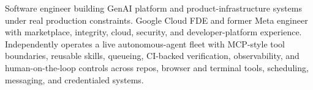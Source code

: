 


Software engineer building GenAI platform and product-infrastructure systems under real production constraints. Google Cloud FDE and former Meta engineer with marketplace, integrity, cloud, security, and developer-platform experience. Independently operates a live autonomous-agent fleet with MCP-style tool boundaries, reusable skills, queueing, CI-backed verification, observability, and human-on-the-loop controls across repos, browser and terminal tools, scheduling, messaging, and credentialed systems.







